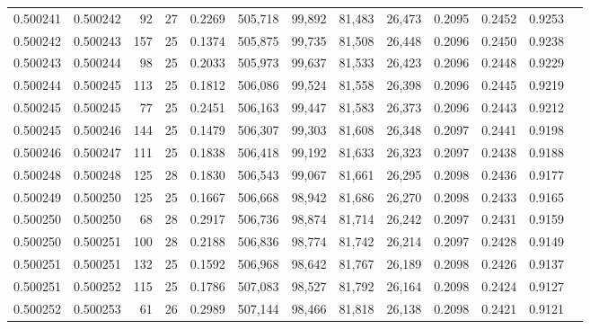 \begin{tabular}{rrrrrrrrrrrrr}
0.500241 & 0.500242 &  92 &  27 &                                     0.2269 & 505,718 &  99,892 &  81,483 &  26,473 & 0.2095 & 0.2452 & 0.9253 \\
0.500242 & 0.500243 & 157 &  25 &                                     0.1374 & 505,875 &  99,735 &  81,508 &  26,448 & 0.2096 & 0.2450 & 0.9238 \\
0.500243 & 0.500244 &  98 &  25 &                                     0.2033 & 505,973 &  99,637 &  81,533 &  26,423 & 0.2096 & 0.2448 & 0.9229 \\
0.500244 & 0.500245 & 113 &  25 &                                     0.1812 & 506,086 &  99,524 &  81,558 &  26,398 & 0.2096 & 0.2445 & 0.9219 \\
0.500245 & 0.500245 &  77 &  25 &                                     0.2451 & 506,163 &  99,447 &  81,583 &  26,373 & 0.2096 & 0.2443 & 0.9212 \\
0.500245 & 0.500246 & 144 &  25 &                                     0.1479 & 506,307 &  99,303 &  81,608 &  26,348 & 0.2097 & 0.2441 & 0.9198 \\
0.500246 & 0.500247 & 111 &  25 &                                     0.1838 & 506,418 &  99,192 &  81,633 &  26,323 & 0.2097 & 0.2438 & 0.9188 \\
0.500248 & 0.500248 & 125 &  28 &                                     0.1830 & 506,543 &  99,067 &  81,661 &  26,295 & 0.2098 & 0.2436 & 0.9177 \\
0.500249 & 0.500250 & 125 &  25 &                                     0.1667 & 506,668 &  98,942 &  81,686 &  26,270 & 0.2098 & 0.2433 & 0.9165 \\
0.500250 & 0.500250 &  68 &  28 &                                     0.2917 & 506,736 &  98,874 &  81,714 &  26,242 & 0.2097 & 0.2431 & 0.9159 \\
0.500250 & 0.500251 & 100 &  28 &                                     0.2188 & 506,836 &  98,774 &  81,742 &  26,214 & 0.2097 & 0.2428 & 0.9149 \\
0.500251 & 0.500251 & 132 &  25 &                                     0.1592 & 506,968 &  98,642 &  81,767 &  26,189 & 0.2098 & 0.2426 & 0.9137 \\
0.500251 & 0.500252 & 115 &  25 &                                     0.1786 & 507,083 &  98,527 &  81,792 &  26,164 & 0.2098 & 0.2424 & 0.9127 \\
0.500252 & 0.500253 &  61 &  26 &                                     0.2989 & 507,144 &  98,466 &  81,818 &  26,138 & 0.2098 & 0.2421 & 0.9121 \\

\end{tabular}
